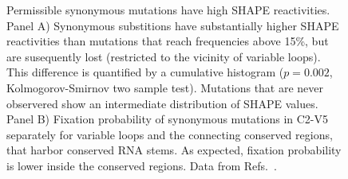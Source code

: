 \documentclass[rmp, twocolumn]{revtex4}
\begin{document}
\begin{figure}
\begin{center}
\caption{Permissible synonymous mutations have
high SHAPE reactivities.
Panel A) Synonymous substitions have
substantially higher SHAPE reactivities than mutations that reach frequencies above 15\%, but are
susequently lost (restricted to the vicinity of variable loops). This difference
is quantified by a cumulative histogram ($p=0.002$, Kolmogorov-Smirnov two 
sample test). Mutations that are never
observered show an intermediate distribution of SHAPE values.
Panel B) Fixation probability of synonymous mutations in C2-V5
separately for variable loops and the connecting conserved regions, that
harbor conserved RNA stems. As expected, fixation probability is lower inside
the conserved regions. Data from Refs.~\cite{shankarappa_consistent_1999,
bunnik_autologous_2008, liu_selection_2006}.}
\label{fig:SHAPE}
\end{center}
\end{figure}


\end{document}
